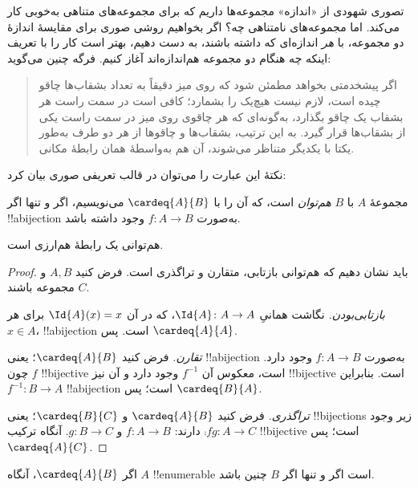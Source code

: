 \documentclass[../../../include/open-logic-section]{subfiles}
\begin{document}


تصوری شهودی از «اندازه» مجموعه‌ها داریم که برای مجموعه‌های متناهی به‌خوبی
کار می‌کند. اما مجموعه‌های نامتناهی چه؟ اگر بخواهیم روشی صوری برای
مقایسهٔ اندازهٔ دو مجموعه، با \emph{هر} اندازه‌ای که داشته باشند، به
دست دهیم، بهتر
است کار را با تعریف اینکه چه هنگام دو مجموعه هم‌اندازه‌اند آغاز کنیم.
فرگه چنین می‌گوید:
\begin{quote}
  اگر پیشخدمتی بخواهد مطمئن شود که روی میز دقیقاً به تعداد بشقاب‌ها
  چاقو چیده است، لازم نیست هیچ‌یک را بشمارد؛ کافی است در سمت راست هر
  بشقاب یک چاقو بگذارد، به‌گونه‌ای که هر چاقوی روی میز در سمت راست
  یکی از بشقاب‌ها قرار گیرد. به این ترتیب، بشقاب‌ها و چاقوها از هر دو طرف به‌طور
  یکتا با یکدیگر متناظر می‌شوند، آن هم به‌واسطهٔ همان رابطهٔ مکانی.
  \citep[\S70]{Frege1884}
\end{quote}
نکتهٔ این عبارت را می‌توان در قالب تعریفی صوری بیان کرد:

\begin{defn}
  مجموعهٔ $A$ با $B$ \emph{هم‌توان} است، که آن را با $\cardeq{A}{B}$
  می‌نویسیم، اگر و تنها اگر !!a{bijection} به‌صورت
  $f \colon A \to B$ وجود داشته باشد.
\end{defn}

\begin{prop}
هم‌توانی یک رابطهٔ هم‌ارزی است.
\end{prop}

\begin{proof}
باید نشان دهیم که هم‌توانی بازتابی، متقارن و تراگذری است. فرض کنید
$A, B$ و $C$ مجموعه باشند.

\emph{بازتابی‌بودن.} نگاشت همانیِ $\Id{A} \colon A \to A$، که در آن
$\Id{A} (x) = x$ برای هر $x \in A$، !!a{bijection} است. پس
$\cardeq{A}{A}$.

\emph{تقارن.} فرض کنید $\cardeq{A}{B}$؛ یعنی !!a{bijection} به‌صورت
$f\colon A \to B$ وجود دارد. چون $f$ !!{bijective} است، معکوس آن
$f^{-1}$ وجود دارد و آن نیز !!{bijective} است. بنابراین
$f^{-1}\colon B \to A$ !!a{bijection} است؛ پس $\cardeq{B}{A}$.

\emph{تراگذری.} فرض کنید $\cardeq{A}{B}$ و $\cardeq{B}{C}$؛ یعنی
!!{bijection}s زیر وجود دارند: $f\colon A \to B$ و $g\colon B \to
C$. آنگاه ترکیب $\comp{f}{g}\colon A \to C$ !!{bijective}
است؛ پس $\cardeq{A}{C}$.
\end{proof}

\begin{prop}
اگر $\cardeq{A}{B}$، آنگاه $A$ !!{enumerable} است اگر
و تنها اگر $B$ چنین باشد.
\end{prop}
\end{document}
